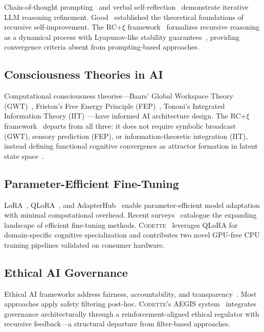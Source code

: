 \documentclass[conference]{IEEEtran}
\newcommand{\codette}{\textsc{Codette}}
\begin{document}
Chain-of-thought prompting~\cite{wei2022chain} and verbal self-reflection~\cite{shinn2023reflexion} demonstrate iterative LLM reasoning refinement. Good~\cite{good1966speculations} established the theoretical foundations of recursive self-improvement. The RC+$\xi$ framework~\cite{harrison2026codettefull} formalizes recursive reasoning as a dynamical process with Lyapunov-like stability guarantees~\cite{khalil2002nonlinear}, providing convergence criteria absent from prompting-based approaches.

\subsection{Consciousness Theories in AI}

Computational consciousness theories---Baars' Global Workspace Theory (GWT)~\cite{baars1997theatre}, Friston's Free Energy Principle (FEP)~\cite{friston2010free}, Tononi's Integrated Information Theory (IIT)~\cite{tononi2004information}---have informed AI architecture design. The RC+$\xi$ framework~\cite{harrison2026codettefull} departs from all three: it does not require symbolic broadcast (GWT), sensory prediction (FEP), or information-theoretic integration (IIT), instead defining functional cognitive convergence as attractor formation in latent state space~\cite{beer2000dynamical}.

\subsection{Parameter-Efficient Fine-Tuning}

LoRA~\cite{hu2021lora}, QLoRA~\cite{dettmers2023qlora}, and AdapterHub~\cite{pfeiffer2020adapterhub} enable parameter-efficient model adaptation with minimal computational overhead. Recent surveys~\cite{lialin2023scaling} catalogue the expanding landscape of efficient fine-tuning methods. \codette{}~\cite{harrison2026codettefull,harrison2025codettehf} leverages QLoRA for domain-specific cognitive specialization and contributes two novel GPU-free CPU training pipelines validated on consumer hardware.

\subsection{Ethical AI Governance}

Ethical AI frameworks address fairness, accountability, and transparency~\cite{mehrabi2021survey}. Most approaches apply safety filtering post-hoc. \codette{}'s AEGIS system~\cite{harrison2025aegisnexus,harrison2025ethics} integrates governance architecturally through a reinforcement-aligned ethical regulator with recursive feedback---a structural departure from filter-based approaches.
\end{document}
